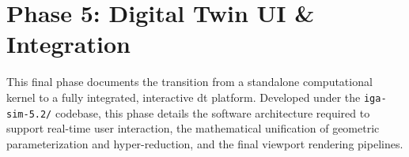 \section{Phase 5: Digital Twin UI \& Integration}
\label{sec:phase5}

This final phase documents the transition from a standalone computational kernel to a fully integrated, interactive \acrlong{dt} platform. Developed under the \texttt{iga-sim-5.2/} codebase, this phase details the software architecture required to support real-time user interaction, the mathematical unification of geometric parameterization and hyper-reduction, and the final viewport rendering pipelines.



